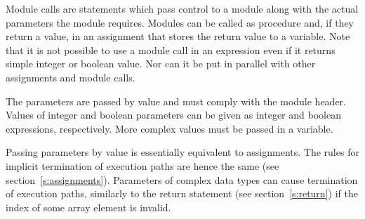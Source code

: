 \documentclass[a4paper,11pt,titlepage,english]{article}
\begin{document}
Module calls are statements which pass control to a module along with the
actual parameters the module requires. Modules can be called as procedure
and, if they return a value, in an assignment that stores the return value
to a variable. Note that it is not possible to use a module call in an
expression even if it returns simple integer or boolean value. Nor can it
be put in parallel with other assignments and module calls.

The parameters are passed by value and must comply with the module
header. Values of integer and boolean parameters can be given as integer
and boolean expressions, respectively. More complex values must be passed
in a variable. 

Passing parameters by value is essentially equivalent to assignments. The
rules for implicit termination of execution paths are hence the same (see
section~\ref{s:assignments}). Parameters of complex data types can cause
termination of execution paths, similarly to the return statement (see
section~\ref{s:return}) if the index of some array element is invalid.




\end{document}
